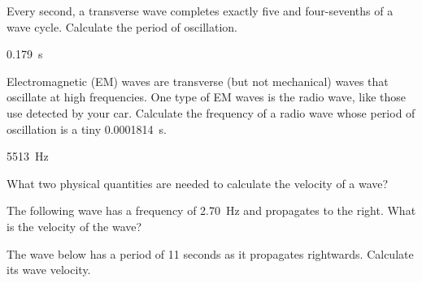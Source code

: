 \documentclass[../main-physics-problems.tex]{subfiles}
\begin{document}
\begin{questions}
\question \label{gz0LQL} 
Every second, a transverse wave completes exactly five and four-sevenths of a wave cycle. Calculate the period of oscillation.


\begin{solution}
\SI{0.179}{s}
\end{solution}

\question \label{MITNpN} 
Electromagnetic (EM) waves are transverse (but not mechanical) waves that oscillate at high frequencies. One type of EM waves is the radio wave, like those use detected by your car. Calculate the frequency of a radio wave whose period of oscillation is a tiny \SI[group-separator={\,}]{0.0001814}{s}.


\begin{solution}
    \SI{5513}{Hz}
\end{solution}

\question
What two physical quantities are needed to calculate the velocity of a wave?


\question \label{SKv3ek}
The following wave has a frequency of \SI{2.70}{Hz} and propagates to the right. What is the velocity of the wave?


\begin{center}
\end{center}


\question \label{HcdmDZ}
The wave below has a period of 11 seconds as it propagates rightwards. Calculate its wave velocity.

\begin{center}
\end{center}



\end{questions}
\end{document}
